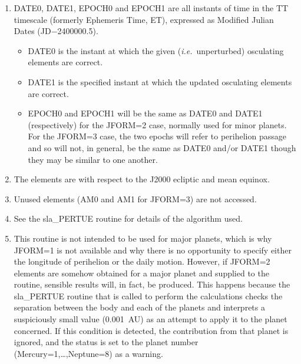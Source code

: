 \documentclass[11pt,twoside]{article}
\begin{document}
{\begin{enumerate}
        \begin{tabbing}
        xxx \= xxxxxxxx \= xx \= \kill
        \> EPOCH  \> = \> epoch of perihelion $T$ (TT MJD) \\
        \> ORBINC \> = \> inclination $i$ (radians) \\
        \> ANODE  \> = \> longitude of the ascending node $\Omega$ (radians) \\
        \> PERIH  \> = \> argument of perihelion $\omega$ (radians) \\
        \> AORQ   \> = \> perihelion distance $q$ (AU) \\
        \> E      \> = \> eccentricity $e$ $( 0 \leq e \leq 10 )$
        \end{tabbing}
 \item DATE0, DATE1, EPOCH0 and EPOCH1 are all instants of time in
       the TT timescale (formerly Ephemeris Time, ET), expressed
       as Modified Julian Dates (JD$-$2400000.5).
       \begin{itemize}
       \item DATE0 is the instant at which the given
             ({\it i.e.}\ unperturbed) osculating elements are correct.
       \item DATE1 is the specified instant at which the updated osculating
             elements are correct.
       \item EPOCH0 and EPOCH1 will be the same as DATE0 and DATE1
             (respectively) for the JFORM=2 case, normally used for minor
             planets.  For the JFORM=3 case, the two epochs will refer to
             perihelion passage and so will not, in general, be the same as
             DATE0 and/or DATE1 though they may be similar to one another.
       \end{itemize}
 \item The elements are with respect to the J2000 ecliptic and mean equinox.
 \item Unused elements (AM0 and AM1 for JFORM=3) are not accessed.
 \item See the sla\_PERTUE routine for details of the algorithm used.
 \item This routine is not intended to be used for major planets, which
       is why JFORM=1 is not available and why there is no opportunity
       to specify either the longitude of perihelion or the daily
       motion.  However, if JFORM=2 elements are somehow obtained for a
       major planet and supplied to the routine, sensible results will,
       in fact, be produced.  This happens because the sla\_PERTUE routine
       that is called to perform the calculations checks the separation
       between the body and each of the planets and interprets a
       suspiciously small value (0.001~AU) as an attempt to apply it to
       the planet concerned.  If this condition is detected, the
       contribution from that planet is ignored, and the status is set to
       the planet number (Mercury=1,\ldots,Neptune=8) as a warning.
 \end{enumerate}
}
\end{document}
